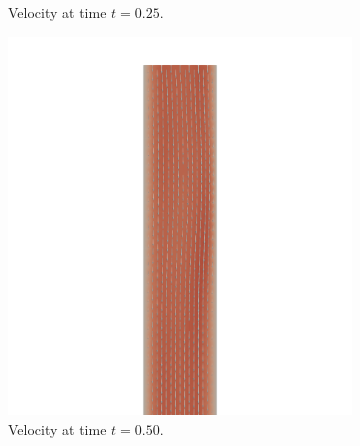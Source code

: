 \documentclass[a4paper,11pt,oneside]{book}
\begin{document}
\begin{figure}[h!]
\begin{subfigure}[b]{0.5\linewidth}
        \centering 
    \caption{Velocity at time $t = 0.25$.} 
    \label{fig3:b} 
    \vspace{4ex}
  \end{subfigure} 
  \begin{subfigure}[b]{0.5\linewidth}
    \centering
    \includegraphics[width=1.2\linewidth]{images/velocity_50_050.png} 
        \centering
    \caption{Velocity at time $t = 0.50$.} 
    \label{fig3:c} 
  \end{subfigure}%
  \begin{subfigure}[b]{0.5\linewidth}
    \centering

\end{subfigure}
\end{figure}
\end{document}
